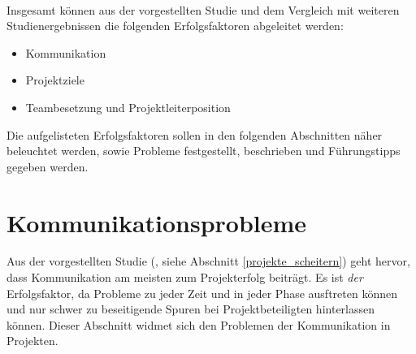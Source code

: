 \documentclass[11pt]{scrartcl}
\begin{document}
\\
Insgesamt können aus der vorgestellten Studie und dem Vergleich mit weiteren Studienergebnissen die folgenden Erfolgsfaktoren abgeleitet werden:
\begin{itemize}
    \item{Kommunikation}
    \item{Projektziele}
    \item{Teambesetzung und Projektleiterposition}
\end{itemize}
Die aufgelisteten Erfolgsfaktoren sollen in den folgenden Abschnitten näher beleuchtet werden, sowie Probleme festgestellt, beschrieben und Führungstipps gegeben werden.
\pagebreak
\section{Kommunikationsprobleme}
\label{kommunikationsprobleme}

Aus der vorgestellten Studie (\cite{GPM_Studie_2008}, siehe Abschnitt \ref{projekte_scheitern}) geht hervor, dass Kommunikation am meisten zum Projekterfolg beiträgt. Es ist \textit{der} Erfolgsfaktor, da Probleme zu jeder Zeit und in jeder Phase ausftreten können und nur schwer zu beseitigende Spuren bei Projektbeteiligten hinterlassen können. Dieser Abschnitt widmet sich den Problemen der Kommunikation in Projekten.

\end{document}
